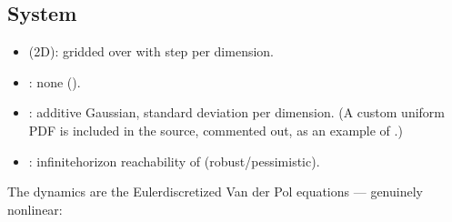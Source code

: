 \documentclass[a4paper,10pt,english]{sphinxmanual}
\begin{document}
\subsection{System}
\label{\detokenize{benchmarks/VP:system}}\begin{itemize}
\item {} 
\sphinxAtStartPar
{} (2D): gridded over  with step  per dimension.

\item {} 
\sphinxAtStartPar
{}: none ().

\item {} 
\sphinxAtStartPar
{}: additive Gaussian, standard deviation  per dimension.
(A custom uniform PDF is included in the source, commented out, as an example of
.)

\item {} 
\sphinxAtStartPar
{}: infinite\sphinxhyphen{}horizon reachability of
 (robust/pessimistic).

\end{itemize}

\sphinxAtStartPar
The dynamics are the Euler\sphinxhyphen{}discretized Van der Pol equations — genuinely nonlinear:

\begin{sphinxVerbatim}[commandchars=\\\{\}]
\PYG{p}{[}\PYG{p}{]}
\PYG{p}{[}\PYG{p}{]}\PYG{p}{[}\PYG{p}{]}\PYG{p}{[}\PYG{p}{]}
\PYG{p}{[}\PYG{p}{]}\PYG{p}{[}\PYG{p}{]}\PYG{p}{[}\PYG{p}{]}\PYG{p}{[}\PYG{p}{]}\PYG{p}{[}\PYG{p}{]}\PYG{p}{[}\PYG{p}{]}
\end{sphinxVerbatim}
\end{document}
